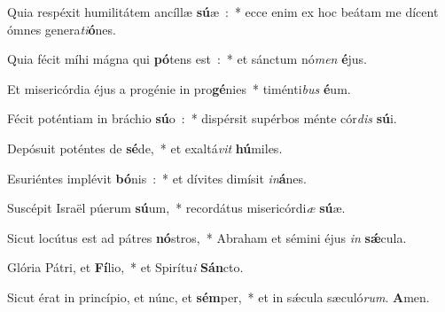 ﻿\item Quia respéxit humilitátem ancíllæ \textbf{sú}\-æ~:~* ecce enim ex hoc beátam me dícent ómnes genera\emph{ti}\textbf{ó}nes.
\item Quia fécit míhi mágna qui \textbf{pó}\-tens est~:~* et sánctum nó\emph{men} \textbf{é}jus.
\item Et misericórdia éjus a progénie in pro\textbf{gé}\-nies~* timénti\emph{bus} \textbf{é}um.
\item Fécit poténtiam in bráchio \textbf{sú}\-o~:~* dispérsit supérbos ménte cór\emph{dis} \textbf{sú}i.
\item Depósuit poténtes de \textbf{sé}\-de,~* et exaltá\emph{vit} \textbf{hú}miles.
\item Esuriéntes implévit \textbf{bó}\-nis~:~* et dívites dimísit \emph{in}\textbf{á}nes.
\item Suscépit Israël púerum \textbf{sú}\-um,~* recordátus misericórdi\emph{æ} \textbf{sú}æ.
\item Sicut locútus est ad pátres \textbf{nó}\-stros,~* Abraham et sémini éjus \emph{in} \textbf{sǽ}cula.
\item Glória Pátri, et \textbf{Fí}\-lio,~* et Spirítu\emph{i} \textbf{Sán}cto.
\item Sicut érat in princípio, et núnc, et \textbf{sém}\-per,~* et in sǽcula sæculó\emph{rum}. \textbf{A}men.